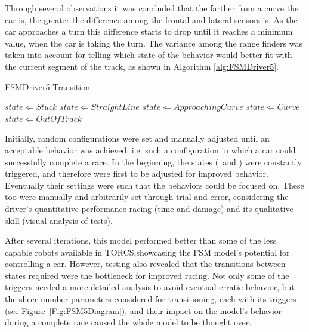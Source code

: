 Through several observations it was concluded that the farther from a curve the car is, the greater the difference among the frontal and lateral sensors is. As the car approaches a turn this difference starts to drop until it reaches a minimum value, when the car is taking the turn. The variance among the range finders was taken into account for telling which state of the  behavior would better fit with the current segment of the track, as shown in Algorithm \ref{alg:FSMDriver5}.


\begin{algorithm}[h]%
\caption{FSMDriver5 Transition}%
\label{alg:FSMDriver5}%
\begin{algorithmic}
        \STATE $state \Leftarrow Stuck$
    \ELSE
   		\STATE $state \Leftarrow StraightLine$
	\ENDIF
		\STATE $state \Leftarrow Approaching Curve$
		\STATE $state \Leftarrow Curve$
	\ELSE
		\STATE $state \Leftarrow Out Of Track$
	\ENDIF
\end{algorithmic}
\end{algorithm}

Initially, random configurations were set and manually adjusted until an acceptable behavior was achieved, i.e. such a configuration in which a car could successfully complete a race. In the beginning, the  states (\OT~and \St) were constantly triggered, and therefore were first to be adjusted for improved behavior. Eventually their settings were such that the  behaviors could be focused on. These too were manually and arbitrarily set through trial and error, considering the driver's quantitative performance racing (time and damage) and its qualitative skill (visual analysis of tests).

After several iterations, this model performed better than some of the less capable robots available in TORCS,showcasing the FSM model's potential for controlling a car. However, testing also revealed that the transitions between states required were the bottleneck for improved racing. Not only some of the triggers needed a more detailed analysis to avoid eventual erratic behavior, but the sheer number parameters considered for transitioning, each with its triggers (see Figure~\ref{Fig:FSM5Diagram}), and their impact on the model's behavior during a complete race caused the whole model to be thought over.


